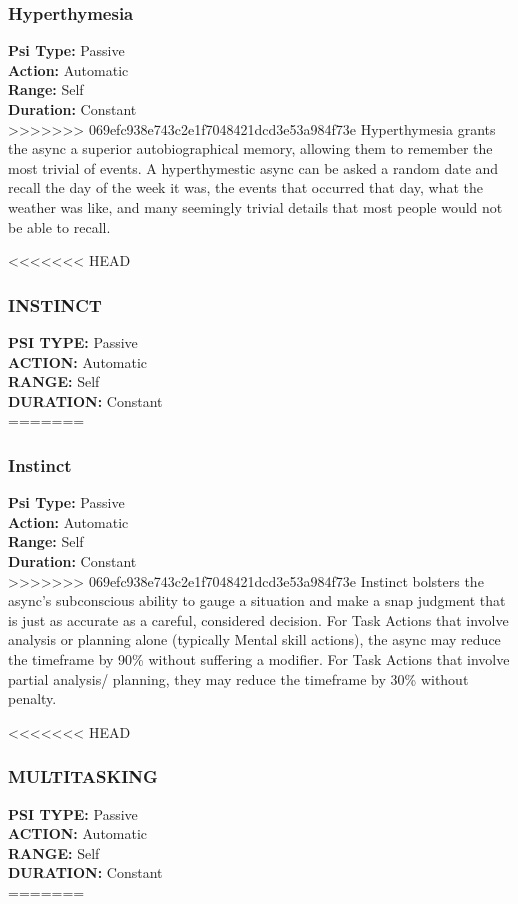 \subsubsection{Hyperthymesia}
\textbf{Psi Type:} Passive \\ 
\textbf{Action:} Automatic \\ 
\textbf{Range:} Self \\ 
\textbf{Duration:} Constant \\
>>>>>>> 069efc938e743c2e1f7048421dcd3e53a984f73e
Hyperthymesia grants the async a superior autobiographical
memory, allowing them to remember the
most trivial of events. A hyperthymestic async can be
asked a random date and recall the day of the week
it was, the events that occurred that day, what the
weather was like, and many seemingly trivial details
that most people would not be able to recall.

<<<<<<< HEAD
\subsubsection{INSTINCT}
\textbf{PSI TYPE:} Passive \\ 
\textbf{ACTION:} Automatic \\ 
\textbf{RANGE:} Self \\ 
\textbf{DURATION:} Constant \\
=======
\subsubsection{Instinct}
\textbf{Psi Type:} Passive \\ 
\textbf{Action:} Automatic \\ 
\textbf{Range:} Self \\ 
\textbf{Duration:} Constant \\
>>>>>>> 069efc938e743c2e1f7048421dcd3e53a984f73e
Instinct bolsters the async’s subconscious ability to
gauge a situation and make a snap judgment that
is just as accurate as a careful, considered decision.
For Task Actions that involve analysis or planning
alone (typically Mental skill actions), the async may
reduce the timeframe by 90\% without suffering a
modifier. For Task Actions that involve partial analysis/
planning, they may reduce the timeframe by 30\%
without penalty.

<<<<<<< HEAD
\subsubsection{MULTITASKING}
\textbf{PSI TYPE:} Passive \\ 
\textbf{ACTION:} Automatic \\ 
\textbf{RANGE:} Self \\ 
\textbf{DURATION:} Constant \\
=======
